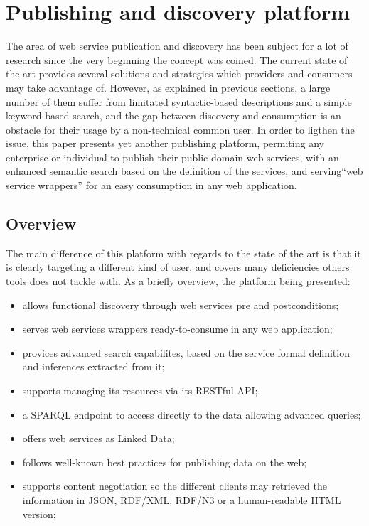 
\section{Publishing and discovery platform}
\label{sec:discovery}

The area of web service publication and discovery has been subject for a lot of research since the very beginning the concept was coined. The current state of the art provides several solutions and strategies which providers and consumers may take advantage of. However, as explained in previous sections, a large number of them suffer from limitated syntactic-based descriptions and a simple keyword-based search, and the gap between discovery and consumption is an obstacle for their usage by a non-technical common user. In order to ligthen the issue, this paper presents yet another publishing platform, permiting any enterprise or individual to publish their public domain web services, with an enhanced semantic search based on the definition of the services, and serving``web service wrappers'' for an easy consumption in any web application.

\subsection{Overview}
\label{ssec:overview}

The main difference of this platform with regards to the state of the art is that it is clearly targeting a different kind of user, and covers many deficiencies others tools does not tackle with. As a briefly overview, the platform being presented:

\begin{itemize}
  \item allows functional discovery through web services pre and postconditions;
	\item serves web services wrappers ready-to-consume in any web application;
	\item provices advanced search capabilites, based on the service formal definition and inferences extracted from it;
	\item supports managing its resources via its RESTful API;
	\item a SPARQL endpoint to access directly to the data allowing advanced queries;
	\item offers web services as Linked Data;
	\item follows well-known best practices for publishing data on the web;
	\item supports content negotiation so the different clients may retrieved the information in JSON, RDF/XML, RDF/N3 or a human-readable HTML version;
\end{itemize}

